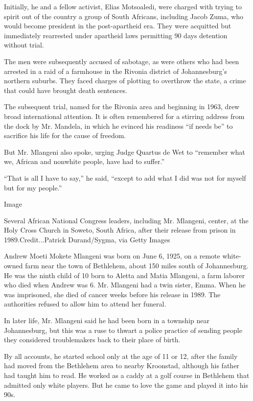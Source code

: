 Initially, he and a fellow activist, Elias Motsoaledi, were charged with
trying to spirit out of the country a group of South Africans, including
Jacob Zuma, who would become president in the post-apartheid era. They
were acquitted but immediately rearrested under apartheid laws
permitting 90 days detention without trial.

The men were subsequently accused of sabotage, as were others who had
been arrested in a raid of a farmhouse in the Rivonia district of
Johannesburg's northern suburbs. They faced charges of plotting to
overthrow the state, a crime that could have brought death sentences.

The subsequent trial, named for the Rivonia area and beginning in 1963,
drew broad international attention. It is often remembered for a
stirring address from the dock by Mr. Mandela, in which he evinced his
readiness ``if needs be'' to sacrifice his life for the cause of
freedom.

But Mr. Mlangeni also spoke, urging Judge Quartus de Wet to ``remember
what we, African and nonwhite people, have had to suffer.''

``That is all I have to say,'' he said, ``except to add what I did was
not for myself but for my people.''

Image

Several African National Congress leaders, including Mr. Mlangeni,
center, at the Holy Cross Church in Soweto, South Africa, after their
release from prison in 1989.Credit...Patrick Durand/Sygma, via Getty
Images

Andrew Moeti Mokete Mlangeni was born on June 6, 1925, on a remote
white-owned farm near the town of Bethlehem, about 150 miles south of
Johannesburg. He was the ninth child of 10 born to Aletta and Matia
Mlangeni, a farm laborer who died when Andrew was 6. Mr. Mlangeni had a
twin sister, Emma. When he was imprisoned, she died of cancer weeks
before his release in 1989. The authorities refused to allow him to
attend her funeral.

In later life, Mr. Mlangeni said he had been born in a township near
Johannesburg, but this was a ruse to thwart a police practice of sending
people they considered troublemakers back to their place of birth.

By all accounts, he started school only at the age of 11 or 12, after
the family had moved from the Bethlehem area to nearby Kroonstad,
although his father had taught him to read. He worked as a caddy at a
golf course in Bethlehem that admitted only white players. But he came
to love the game and played it into his 90s.


